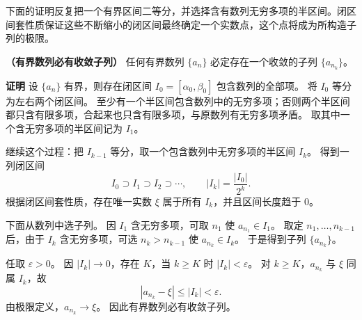 \documentclass[fontset=fandol]{ctexart}
\newenvironment{custom}[1]{\par\noindent\textbf{#1}\quad}{\par\vspace{0.8em}}
\begin{document}
下面的证明反复把一个有界区间二等分，并选择含有数列无穷多项的半区间。闭区间套性质保证这些不断缩小的闭区间最终确定一个实数点，这个点将成为所构造子列的极限。

\begin{theorem}
\textbf{（有界数列必有收敛子列）}
任何有界数列 \(\{a_n\}\) 必定存在一个收敛的子列 \(\{a_{n_k}\}\)。
\end{theorem}

\begin{custom}{证明}
设 $\{a_n\}$ 有界，则存在闭区间 $I_0=[\alpha_0,\beta_0]$ 包含数列的全部项。 将 $I_0$ 等分为左右两个闭区间。 至少有一个半区间包含数列中的无穷多项；否则两个半区间都只含有限多项，合起来也只含有限多项，与原数列有无穷多项矛盾。 取其中一个含无穷多项的半区间记为 $I_1$。

继续这个过程：把 $I_{k-1}$ 等分，取一个包含数列中无穷多项的半区间 $I_k$。 得到一列闭区间
\[
I_0\supset I_1\supset I_2\supset\cdots,\qquad |I_k|=\frac{|I_0|}{2^k}.
\]
根据闭区间套性质，存在唯一实数 $\xi$ 属于所有 $I_k$，并且区间长度趋于 $0$。

下面从数列中选子列。 因 $I_1$ 含无穷多项，可取 $n_1$ 使 $a_{n_1}\in I_1$。 取定 $n_1,\ldots,n_{k-1}$ 后，由于 $I_k$ 含无穷多项，可选 $n_k>n_{k-1}$ 使 $a_{n_k}\in I_k$。 于是得到子列 $\{a_{n_k}\}$。

任取 $\varepsilon>0$。 因 $|I_k|\to0$，存在 $K$，当 $k\ge K$ 时 $|I_k|<\varepsilon$。 对 $k\ge K$，$a_{n_k}$ 与 $\xi$ 同属 $I_k$，故
\[
|a_{n_k}-\xi|\le |I_k|<\varepsilon.
\]
由极限定义，$a_{n_k}\to\xi$。 因此有界数列必有收敛子列。
\end{custom}
\end{document}
